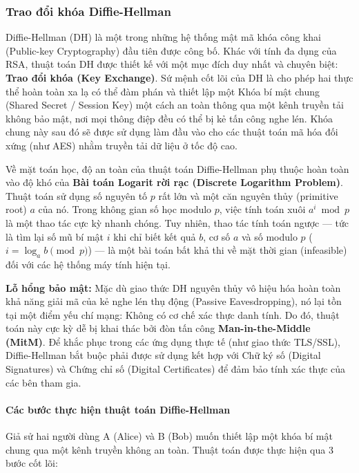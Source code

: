 \subsubsection*{Trao đổi khóa Diffie-Hellman}
Diffie-Hellman (DH) là một trong những hệ thống mật mã khóa công khai (Public-key Cryptography) đầu tiên được công bố. Khác với tính đa dụng của RSA, thuật toán DH được thiết kế với một mục đích duy nhất và chuyên biệt: \textbf{Trao đổi khóa (Key Exchange)}. Sứ mệnh cốt lõi của DH là cho phép hai thực thể hoàn toàn xa lạ có thể đàm phán và thiết lập một Khóa bí mật chung (Shared Secret / Session Key) một cách an toàn thông qua một kênh truyền tải không bảo mật, nơi mọi thông điệp đều có thể bị kẻ tấn công nghe lén. Khóa chung này sau đó sẽ được sử dụng làm đầu vào cho các thuật toán mã hóa đối xứng (như AES) nhằm truyền tải dữ liệu ở tốc độ cao.

Về mặt toán học, độ an toàn của thuật toán Diffie-Hellman phụ thuộc hoàn toàn vào độ khó của \textbf{Bài toán Logarit rời rạc (Discrete Logarithm Problem)}. Thuật toán sử dụng số nguyên tố $p$ rất lớn và một căn nguyên thủy (primitive root) $a$ của nó. Trong không gian số học modulo $p$, việc tính toán xuôi $a^i \bmod p$ là một thao tác cực kỳ nhanh chóng. Tuy nhiên, thao tác tính toán ngược — tức là tìm lại số mũ bí mật $i$ khi chỉ biết kết quả $b$, cơ số $a$ và số modulo $p$ ($i = \log_a b \pmod p$) — là một bài toán bất khả thi về mặt thời gian (infeasible) đối với các hệ thống máy tính hiện tại.

\textbf{Lỗ hổng bảo mật:} Mặc dù giao thức DH nguyên thủy vô hiệu hóa hoàn toàn khả năng giải mã của kẻ nghe lén thụ động (Passive Eavesdropping), nó lại tồn tại một điểm yếu chí mạng: Không có cơ chế xác thực danh tính. Do đó, thuật toán này cực kỳ dễ bị khai thác bởi đòn tấn công \textbf{Man-in-the-Middle (MitM)}. Để khắc phục trong các ứng dụng thực tế (như giao thức TLS/SSL), Diffie-Hellman bắt buộc phải được sử dụng kết hợp với Chữ ký số (Digital Signatures) và Chứng chỉ số (Digital Certificates) để đảm bảo tính xác thực của các bên tham gia.

\paragraph*{Các bước thực hiện thuật toán Diffie-Hellman}

Giả sử hai người dùng A (Alice) và B (Bob) muốn thiết lập một khóa bí mật chung qua một kênh truyền không an toàn. Thuật toán được thực hiện qua 3 bước cốt lõi:

